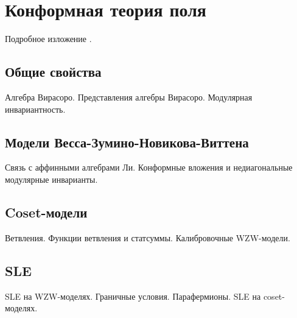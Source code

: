 \chapter{Конформная теория поля}
\label{cha:cft}

Подробное изложение \cite{difrancesco1997cft}. 

\section{Общие свойства}
\label{sec:cft-general}
Алгебра Вирасоро. Представления алгебры Вирасоро. Модулярная инвариантность.

\section{Модели Весса-Зумино-Новикова-Виттена}
\label{sec:wzw}
Связь с аффинными алгебрами Ли.
Конформные вложения и недиагональные модулярные инварианты. 

\section{Coset-модели}
\label{sec:coset-models}
Ветвления. Функции ветвления и статсуммы. 
Калибровочные WZW-модели. 

\section{SLE}
\label{sec:sle}
SLE на WZW-моделях. Граничные условия. Парафермионы. SLE на coset-моделях.

